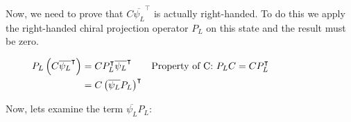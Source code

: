 Now, we need to prove that $C \overline{\psi_L}^\intercal$ is actually right-handed. To do this we apply the right-handed chiral projection operator $P_L$ on this state and
the result must be zero.

\begin{align}
  &\begin{aligned}
     \mathllap{P_L \left( C \overline{\psi_L}^\intercal \right)} &= C P_L^\intercal \overline{\psi_L}^\intercal &\text{Property of C: $P_LC = C P_L^\intercal$}\\        
     \mathllap{} &= C \left( \overline{\psi_L}P_L \right)^\intercal  
  &\end{aligned}
\end{align}

Now, lets examine the term $\overline{\psi_L}P_L$:

